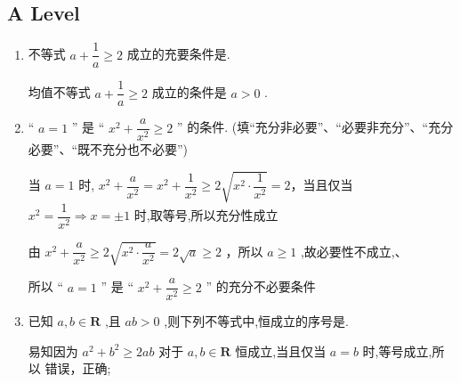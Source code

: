 \subsection*{A Level}
\begin{enumerate}
    \item 不等式 $a + \dfrac{1}{a} \geq  2$ 成立的充要条件是.
    \begin{jieda}
        均值不等式 $a + \dfrac{1}{a} \geq  2$ 成立的条件是 $a > 0$ .
    \end{jieda}
    \item “ $a = 1$ ” 是 “ ${x}^{2} + \dfrac{a}{{x}^{2}} \geq  2$ ” 的条件. (填“充分非必要”、“必要非充分”、“充分必要”、“既不充分也不必要”)
    \begin{jieda}
        当 $a = 1$ 时, ${x}^{2} + \dfrac{a}{{x}^{2}} = {x}^{2} + \dfrac{1}{{x}^{2}} \geq  2\sqrt{{x}^{2} \cdot  \dfrac{1}{{x}^{2}}} = 2$，当且仅当 ${x}^{2} = \dfrac{1}{{x}^{2}} \Longrightarrow  x =  \pm  1$ 时,取等号,所以充分性成立
        
        由 ${x}^{2} + \dfrac{a}{{x}^{2}} \geq  2\sqrt{{x}^{2} \cdot  \dfrac{a}{{x}^{2}}} = 2\sqrt{a} \geq  2$ ，所以 $a \geq  1$ ,故必要性不成立,、
        
        所以 “ $a = 1$ ” 是 “ ${x}^{2} + \dfrac{a}{{x}^{2}} \geq  2$ ” 的充分不必要条件
    \end{jieda}
    \item 已知 $a,b \in  \mathbf{R}$ ,且 ${ab} > 0$ ,则下列不等式中,恒成立的序号是.
    \begin{jieda}
        易知因为 ${a}^{2} + {b}^{2} \geq  {2ab}$ 对于 $a,b \in  \mathbf{R}$ 恒成立,当且仅当 $a = b$ 时,等号成立,所以  错误，正确;


\end{jieda}
\end{enumerate}
